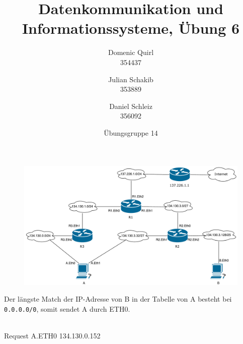 \documentclass{../exercisesheet}
\title{Datenkommunikation und Informationssysteme, Übung 6}
\author{
    Domenic Quirl \\ 354437
    \and
    Julian Schakib \\ 353889
    \and 
    Daniel Schleiz \\ 356092
}
\date{Übungsgruppe 14}
\begin{document}
\maketitle
\pointtable


\begin{exercise}{4}
\begin{subexercise}

\end{subexercise}
\begin{subexercise}

\end{subexercise}
\begin{subexercise}

\end{subexercise}
\end{exercise}


\begin{exercise}{6}
\begin{subexercise}

\end{subexercise}
\begin{subexercise}

\end{subexercise}
\begin{subexercise}

\end{subexercise}
\begin{subexercise}

\end{subexercise}
\end{exercise}


\begin{exercise}{5}
\begin{subexercise}
\begin{figure}[H]
  \centering
  \includegraphics[width=\textwidth]{a3_network.pdf}
\end{figure}
\end{subexercise}
\begin{subexercise}
Der längste Match der IP-Adresse von B in der Tabelle von A besteht bei \texttt{0.0.0.0/0}, somit sendet A durch ETH0.\\ \ \\
\begin{tt}
Request A.ETH0 134.130.0.152
\end{tt}
\end{subexercise}
\end{exercise}
\end{document}
